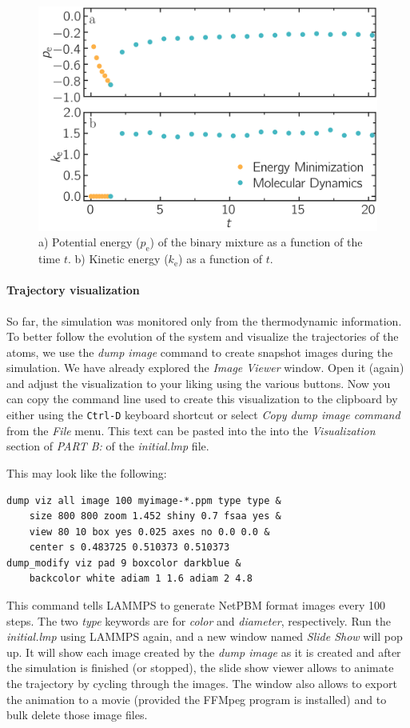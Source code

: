 \documentclass[9pt,tutorial]{livecoms}
\begin{document}
\begin{figure}
\centering
\includegraphics[width=\linewidth]{LJ-energy}
\caption{a) Potential energy ($p_\text{e}$) of the binary mixture as a function
of the time $t$. b) Kinetic energy ($k_\text{e}$) as a function of $t$.}
\label{fig:evolution-energy}
\end{figure}

\paragraph{Trajectory visualization}

So far, the simulation was monitored only from the thermodynamic
information.  To better follow the evolution of the system and visualize
the trajectories of the atoms, we use the \textit{dump image} command to
create snapshot images during the simulation.  We have already explored
the \textit{Image Viewer} window.  Open it (again) and adjust the
visualization to your liking using the various buttons.  Now you can
copy the command line used to create this visualization to the clipboard
by either using the \texttt{Ctrl-D} keyboard shortcut or select
\textit{Copy dump image command} from the \textit{File} menu.  This text
can be pasted into the into the \textit{Visualization} section of
\textit{PART B:} of the \textit{initial.lmp} file.

This may look like the following:
\begin{lstlisting}
dump viz all image 100 myimage-*.ppm type type &
    size 800 800 zoom 1.452 shiny 0.7 fsaa yes &
    view 80 10 box yes 0.025 axes no 0.0 0.0 &
    center s 0.483725 0.510373 0.510373
dump_modify viz pad 9 boxcolor darkblue &
    backcolor white adiam 1 1.6 adiam 2 4.8
\end{lstlisting}
This command tells LAMMPS to generate NetPBM format images every 100
steps. The two \textit{type} keywords are for \textit{color} and
\textit{diameter}, respectively.  Run the \textit{initial.lmp} using
LAMMPS again, and a new window named \textit{Slide Show} will pop up.
It will show each image created by the \textit {dump image} as it is
created and after the simulation is finished (or stopped), the slide
show viewer allows to animate the trajectory by cycling through the
images.  The window also allows to export the animation to a movie
(provided the FFMpeg program is installed) and to bulk delete those
image files.
\end{document}

